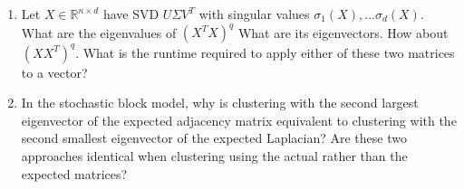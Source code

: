 \documentclass[10pt]{article}
\newcommand{\R}{\mathbb{R}}
\newcommand{\E}{\mathbb{E}}
\DeclareMathOperator*{\argmin}{arg\,min}
\begin{document}
\begin{itemize}
\begin{enumerate}
		\item  Let $X \in \R^{n\times d}$ have SVD $U\Sigma V^T$ with singular values $\sigma_1(X), . . . \sigma_d(X)$. What are the eigenvalues of $(X^TX)^q$ What are its eigenvectors. How about $(XX^T)^q$. What is the runtime required to apply either of these two matrices to a vector?
		\item In the stochastic block model, why is clustering with the second largest eigenvector of the expected adjacency matrix equivalent to clustering with the second smallest eigenvector of the expected Laplacian? Are these two approaches identical when clustering using the actual rather than the expected matrices?
	\end{enumerate}
\end{itemize}
\end{document}
